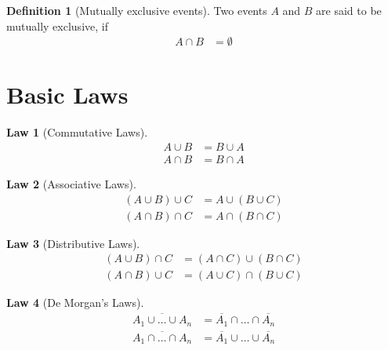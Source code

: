\documentclass[titlepage, fleqn, a4paper, 12pt, twoside]{article}
\theoremstyle{definition}
\newtheorem{definition}{Definition}
\theoremstyle{theorem}
\newtheorem{law}{Law}
\begin{document}
\begin{definition}[Mutually exclusive events]
	Two events $A$ and $B$ are said to be mutually exclusive, if
	\begin{align*}
		A \cap B & = \emptyset
	\end{align*}
\end{definition}

\section{Basic Laws}

\begin{law}[Commutative Laws]
	\begin{align*}
		A \cup B & = B \cup A \\
		A \cap B & = B \cap A
	\end{align*}
\end{law}

\begin{law}[Associative Laws]
	\begin{align*}
		(A \cup B) \cup C & = A \cup (B \cup C) \\
		(A \cap B) \cap C & = A \cap (B \cap C)
	\end{align*}
\end{law}

\begin{law}[Distributive Laws]
	\begin{align*}
		(A \cup B) \cap C & = (A \cap C) \cup (B \cap C) \\
		(A \cap B) \cup C & = (A \cup C) \cap (B \cup C)
	\end{align*}
\end{law}

\begin{law}[De Morgan's Laws]
	\begin{align*}
		\overline{A_1 \cup \dots \cup A_n} & = \overline{A_1} \cap \dots \cap \overline{A_n} \\
		\overline{A_1 \cap \dots \cap A_n} & = \overline{A_1} \cup \dots \cup \overline{A_n}
	\end{align*}
\end{law}
\end{document}
